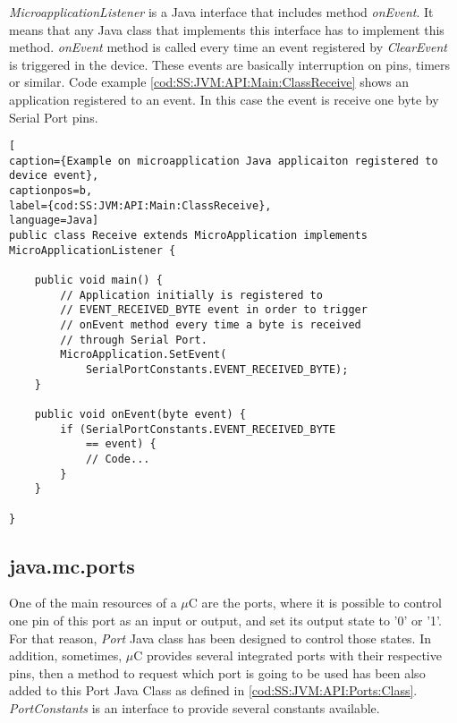 \textit{MicroapplicationListener} is a Java interface that includes method \textit{onEvent}. It means that any Java class that implements this interface has to implement this method. \textit{onEvent} method is called every time an event registered by \textit{ClearEvent} is triggered in the device. These events are basically interruption on pins, timers or similar. Code example \ref{cod:SS:JVM:API:Main:ClassReceive} shows an application registered to an event. In this case the event is receive one byte by Serial Port pins.

\medskip
\begin{lstlisting}[
caption={Example on microapplication Java applicaiton registered to device event},
captionpos=b,
label={cod:SS:JVM:API:Main:ClassReceive},
language=Java]
public class Receive extends MicroApplication implements
MicroApplicationListener {

    public void main() {
        // Application initially is registered to
        // EVENT_RECEIVED_BYTE event in order to trigger
        // onEvent method every time a byte is received
        // through Serial Port.
        MicroApplication.SetEvent(
            SerialPortConstants.EVENT_RECEIVED_BYTE);
    }

    public void onEvent(byte event) {
    	if (SerialPortConstants.EVENT_RECEIVED_BYTE
    	    == event) {
    		// Code...
    	}
    }

}
\end{lstlisting}
\medskip

\subsection{java.mc.ports}\label{SS:JVM:API:Ports}
One of the main resources of a $\mu$C are the ports, where it is possible to control one pin of this port as an input or output, and set its output state to '0' or '1'. For that reason, \textit{Port} Java class has been designed to control those states. In addition, sometimes, $\mu$C provides several integrated ports with their respective pins, then a method to request which port is going to be used has been also added to this Port Java Class as defined in \ref{cod:SS:JVM:API:Ports:Class}. \textit{PortConstants} is an interface to provide several constants available.

